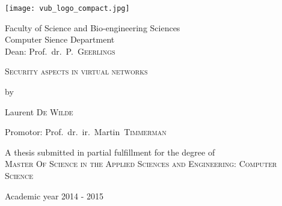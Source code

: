 

\begin{titlepage}


\fontsize{12pt}{14pt}
\selectfont

\begin{center}

\texttt{[image: vub\_logo\_compact.jpg]}

\vspace{0.5cm}

Faculty of Science and Bio-engineering Sciences\\
Computer Sience Department\\
Dean: Prof.~dr.~P.~\textsc{Geerlings}

\vspace{2.0cm}

\fontsize{17.28pt}{21pt}
\selectfont

\textsc{Security aspects in virtual networks}

\fontsize{12pt}{14pt}
\selectfont

\vspace{.6cm}

by 

\vspace{.4cm}

Laurent \textsc{De Wilde}

\vspace{2.5cm}

Promotor: Prof.~dr.~ir.~Martin~\textsc{Timmerman}

\vspace{1.5cm}

A thesis submitted in partial fulfillment for the degree  of\\
\textsc{Master Of Science in the Applied Sciences and Engineering: Computer Science}

\vspace{0.75cm}

Academic year 2014 - 2015

\end{center}
\end{titlepage}

\thispagestyle{empty}